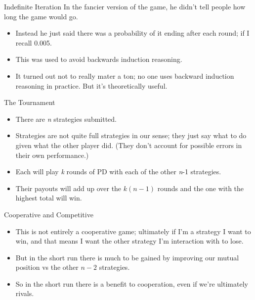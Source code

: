 \documentclass[
  ignorenonframetext,
]{beamer}
\providecommand{\tightlist}{%
  \setlength{\itemsep}{0pt}\setlength{\parskip}{0pt}}
\begin{document}
\begin{frame}{Indefinite Iteration}
\protect\hypertarget{indefinite-iteration}{}
In the fancier version of the game, he didn't tell people how long the
game would go.

\begin{itemize}
\tightlist
\item
  Instead he just said there was a probability of it ending after each
  round; if I recall 0.005.
\item
  This was used to avoid backwards induction reasoning.
\item
  It turned out not to really mater a ton; no one uses backward
  induction reasoning in practice. But it's theoretically useful.
\end{itemize}
\end{frame}

\begin{frame}{The Tournament}
\protect\hypertarget{the-tournament}{}
\begin{itemize}
\tightlist
\item
  There are \emph{n} strategies submitted.
\item
  Strategies are not quite full strategies in our sense; they just say
  what to do given what the other player did. (They don't account for
  possible errors in their own performance.)
\item
  Each will play \emph{k} rounds of PD with each of the other \emph{n}-1
  strategies.
\item
  Their payouts will add up over the \(k(n-1)\) rounds and the one with
  the highest total will win.
\end{itemize}
\end{frame}

\begin{frame}{Cooperative and Competitive}
\protect\hypertarget{cooperative-and-competitive}{}
\begin{itemize}
\tightlist
\item
  This is not entirely a cooperative game; ultimately if I'm a strategy
  I want to win, and that means I want the other strategy I'm
  interaction with to lose.
\item
  But in the short run there is much to be gained by improving our
  mutual position vs the other \(n-2\) strategies.
\item
  So in the short run there is a benefit to cooperation, even if we're
  ultimately rivals.
\end{itemize}
\end{frame}
\end{document}
